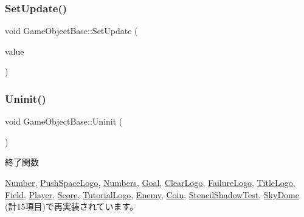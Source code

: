 \mbox{\label{class_game_object_base_a71704e8310b3183f3f88869f8fd27d08}} 
\subsubsection{\texorpdfstring{Set\+Update()}{SetUpdate()}}
{\footnotesize\ttfamily void Game\+Object\+Base\+::\+Set\+Update (\begin{DoxyParamCaption}\item[{\mbox{\hyperlink{class_update_base}{Update\+Base}} $\ast$}]{value }\end{DoxyParamCaption})\hspace{0.3cm}{\ttfamily [inline]}}

\mbox{\label{class_game_object_base_a97e1bc277d7b1c0156d4735de29a022c}} 
\subsubsection{\texorpdfstring{Uninit()}{Uninit()}}
{\footnotesize\ttfamily void Game\+Object\+Base\+::\+Uninit (\begin{DoxyParamCaption}{ }\end{DoxyParamCaption})\hspace{0.3cm}{\ttfamily [virtual]}}



終了関数 



\mbox{\hyperlink{class_number_a7c3bf9c55f7a0a19d80129c5f07f99f2}{Number}}, \mbox{\hyperlink{class_push_space_logo_a06404113db417c58941ca7a13bba161e}{Push\+Space\+Logo}}, \mbox{\hyperlink{class_numbers_aeaad3cc1b8ae7defe79813b983b04101}{Numbers}}, \mbox{\hyperlink{class_goal_a48126385a674bcda855e2a61561fbf9f}{Goal}}, \mbox{\hyperlink{class_clear_logo_ab55def116615b92a8e8cc40b364b7a4c}{Clear\+Logo}}, \mbox{\hyperlink{class_failure_logo_adbe01fc4567ade0e788f511f5162299c}{Failure\+Logo}}, \mbox{\hyperlink{class_title_logo_a177943b3becc80fcdb7a34f131b07ee9}{Title\+Logo}}, \mbox{\hyperlink{class_field_a6d1015e2409daa87cd00485ac1efc06b}{Field}}, \mbox{\hyperlink{class_player_a7455a83ac23d2f5e0cce0ddd7d92db0c}{Player}}, \mbox{\hyperlink{class_score_a605e163dc59ccc4d19a3cb6b5db813b8}{Score}}, \mbox{\hyperlink{class_tutorial_logo_a8e1f1dba47dadf7d1bb40f616324ffb5}{Tutorial\+Logo}}, \mbox{\hyperlink{class_enemy_a9aeaa757abdf0c37fd67c4ce5aed6962}{Enemy}}, \mbox{\hyperlink{class_coin_a4d364dcb4b57b80ea00ce931d0bb300f}{Coin}}, \mbox{\hyperlink{class_stencil_shadow_test_a51b5d75aaba5673a13f950bd6b742720}{Stencil\+Shadow\+Test}}, \mbox{\hyperlink{class_sky_dome_a7fc71bfa671cf6e7ab26a194459b0753}{Sky\+Dome}} (計15項目)で再実装されています。



